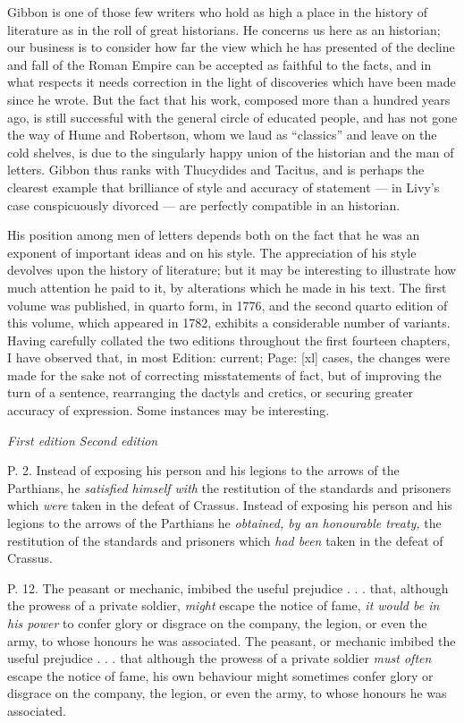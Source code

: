 Gibbon is one of those few writers who hold as high a place in the history of literature as in the roll of great historians. He concerns us here as an historian; our business is to consider how far the view which he has presented of the decline and fall of the Roman Empire can be accepted as faithful to the facts, and in what respects it needs correction in the light of discoveries which have been made since he wrote. But the fact that his work, composed more than a hundred years ago, is still successful with the general circle of educated people, and has not gone the way of Hume and Robertson, whom we laud as \texthebrew{“}classics\texthebrew{}” and leave on the cold shelves, is due to the singularly happy union of the historian and the man of letters. Gibbon thus ranks with Thucydides and Tacitus, and is perhaps the clearest example that brilliance of style and accuracy of statement \texthebrew{—} in Livy\texthebrew{}’s case conspicuously divorced \texthebrew{—} are perfectly compatible in an historian.

His position among men of letters depends both on the fact that he was an exponent of important ideas and on his style. The appreciation of his style devolves upon the history of literature; but it may be interesting to illustrate how much attention he paid to it, by alterations which he made in his text. The first volume was published, in quarto form, in 1776, and the second quarto edition of this volume, which appeared in 1782, exhibits a considerable number of variants. Having carefully collated the two editions throughout the first fourteen chapters, I have observed that, in most Edition: current; Page: [xl] cases, the changes were made for the sake not of correcting misstatements of fact, but of improving the turn of a sentence, rearranging the dactyls and cretics, or securing greater accuracy of expression. Some instances may be interesting.

\emph{First edition}
\emph{Second edition}

P. 2.
Instead of exposing his person and his legions to the arrows of the Parthians, he \emph{satisfied himself with} the restitution of the standards and prisoners which \emph{were} taken in the defeat of Crassus.
Instead of exposing his person and his legions to the arrows of the Parthians he \emph{obtained, by an honourable treaty,} the restitution of the standards and prisoners which \emph{had been} taken in the defeat of Crassus.

P. 12.
The peasant or mechanic, imbibed the useful prejudice . . . that, although the prowess of a private soldier, \emph{might} escape the notice of fame, \emph{it would be in his power} to confer glory or disgrace on the company, the legion, or even the army, to whose honours he was associated.
The peasant, or mechanic imbibed the useful prejudice . . . that although the prowess of a private soldier \emph{must often} escape the notice of fame, his own behaviour might sometimes confer glory or disgrace on the company, the legion, or even the army, to whose honours he was associated.

